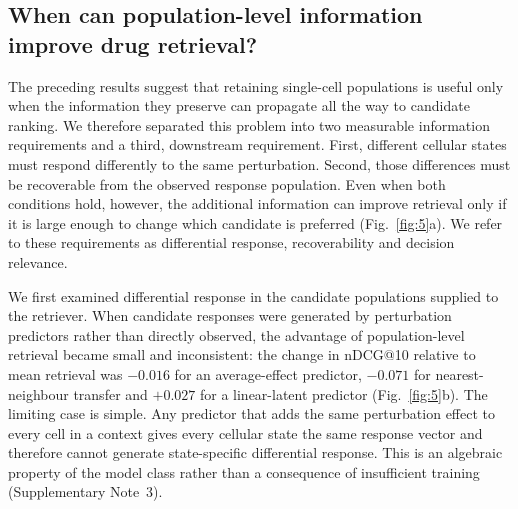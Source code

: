 \documentclass[11pt,letterpaper]{article}
\begin{document}
\subsection*{When can population-level information improve drug retrieval?}

The preceding results suggest that retaining single-cell populations is useful only when the information they preserve can propagate all the way to candidate ranking. We therefore separated this problem into two measurable information requirements and a third, downstream requirement. First, different cellular states must respond differently to the same perturbation. Second, those differences must be recoverable from the observed response population. Even when both conditions hold, however, the additional information can improve retrieval only if it is large enough to change which candidate is preferred (Fig.~\ref{fig:5}a). We refer to these requirements as differential response, recoverability and decision relevance.

We first examined differential response in the candidate populations supplied to the retriever. When candidate responses were generated by perturbation predictors rather than directly observed, the advantage of population-level retrieval became small and inconsistent: the change in nDCG@10 relative to mean retrieval was $-0.016$ for an average-effect predictor, $-0.071$ for nearest-neighbour transfer and $+0.027$ for a linear-latent predictor (Fig.~\ref{fig:5}b). The limiting case is simple. Any predictor that adds the same perturbation effect to every cell in a context gives every cellular state the same response vector and therefore cannot generate state-specific differential response. This is an algebraic property of the model class rather than a consequence of insufficient training (Supplementary Note~3).
\end{document}
